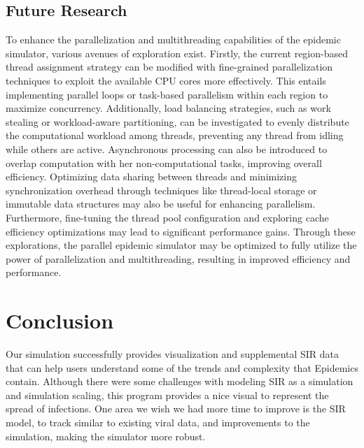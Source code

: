 \documentclass[conference]{IEEEtran}
\begin{document}
\subsection{Future Research}

To enhance the parallelization and multithreading capabilities of the epidemic simulator, various avenues of exploration exist. Firstly, the current region-based thread assignment strategy can be modified with fine-grained parallelization techniques to exploit the available CPU cores more effectively. This entails implementing parallel loops or task-based parallelism within each region to maximize concurrency. Additionally, load balancing strategies, such as work stealing or workload-aware partitioning, can be investigated to evenly distribute the computational workload among threads, preventing any thread from idling while others are active. Asynchronous processing can also be introduced to overlap computation with her non-computational tasks, improving overall efficiency. Optimizing data sharing between threads and minimizing synchronization overhead through techniques like thread-local storage or immutable data structures may also be useful for enhancing parallelism. Furthermore, fine-tuning the thread pool configuration and exploring cache efficiency optimizations may lead to significant performance gains. Through these explorations, the parallel epidemic simulator may be optimized to fully utilize the power of parallelization and multithreading, resulting in improved efficiency and performance.

\section{Conclusion}

Our simulation successfully provides visualization and supplemental SIR data that can help users understand some of the trends and complexity that Epidemics contain. Although there were some challenges with modeling SIR as a simulation and simulation scaling, this program provides a nice visual to represent the spread of infections. One area we wish we had more time to improve is the SIR model, to track similar to existing viral data, and improvements to the simulation, making the simulator more robust.
\end{document}
